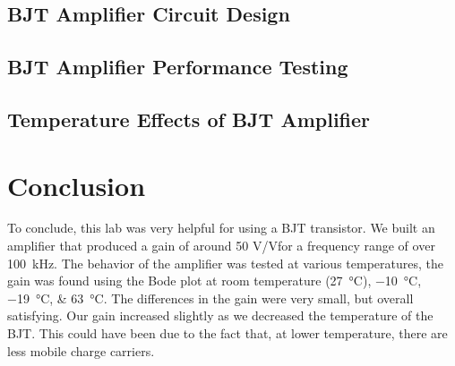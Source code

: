 \documentclass[journal]{IEEEtran}
\begin{document}
\subsection{BJT Amplifier Circuit Design}
\subsection{BJT Amplifier Performance Testing}
\subsection{Temperature Effects of BJT Amplifier}

\section{Conclusion}
\par To conclude, this lab was very helpful for using a BJT transistor. We built an amplifier that produced a gain of around 50 \si{\volt}/\si{\volt}for a frequency range of over \SI{100}{\kilo\hertz}.
The behavior of the amplifier was tested at various temperatures, the gain was found using the Bode plot at room temperature (\SI{27}{\celsius}), \SIlist{-10;-19;63}{\celsius}. The differences in the gain were very small, but overall satisfying. Our gain increased slightly as we decreased the temperature of the BJT. This could have been due to the fact that, at lower temperature, there are less mobile charge carriers.
\end{document}
